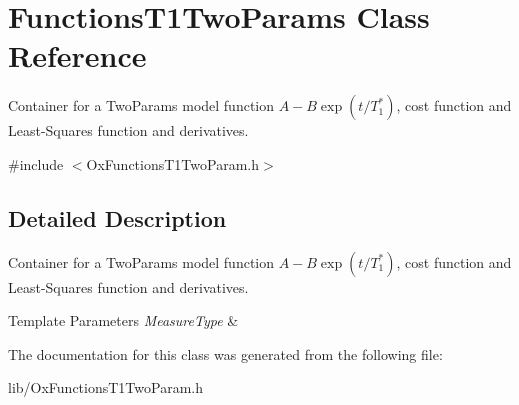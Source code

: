 \hypertarget{class_functions_t1_two_params}{\section{Functions\-T1\-Two\-Params Class Reference}
\label{class_functions_t1_two_params}
}


Container for a Two\-Params model function $ A-B\exp(t/T_1^*) $, cost function and Least-\/\-Squares function and derivatives.  




{\ttfamily \#include $<$Ox\-Functions\-T1\-Two\-Param.\-h$>$}



\subsection{Detailed Description}
Container for a Two\-Params model function $ A-B\exp(t/T_1^*) $, cost function and Least-\/\-Squares function and derivatives. 


\begin{DoxyTemplParams}{Template Parameters}
{\em Measure\-Type} & \\
\hline
\end{DoxyTemplParams}


The documentation for this class was generated from the following file\-:\begin{DoxyCompactItemize}
\item 
lib/Ox\-Functions\-T1\-Two\-Param.\-h\end{DoxyCompactItemize}
